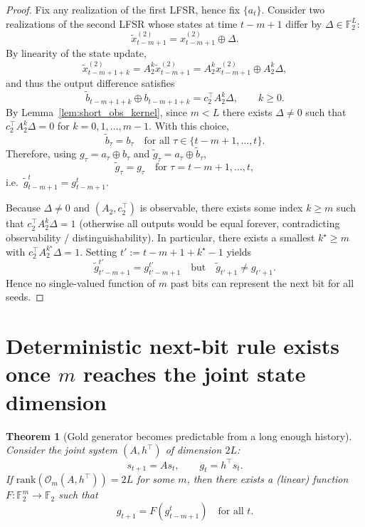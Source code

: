 \documentclass[12pt,a4paper]{report}
\newcommand{\F}{\mathbb{F}}
\newcommand{\rank}{\mathrm{rank}}
\theoremstyle{plain}
\newtheorem{thm}{Theorem}
\begin{document}
\begin{proof}
Fix any realization of the first LFSR, hence fix $\{a_t\}$.
Consider two realizations of the second LFSR whose states at time $t-m+1$ differ by
$\Delta\in \F_2^L$:
\begin{equation}
\tilde x^{(2)}_{t-m+1} = x^{(2)}_{t-m+1}\oplus \Delta.
\end{equation}
By linearity of the state update,
\[
\tilde x^{(2)}_{t-m+1+k} = A_2^k \tilde x^{(2)}_{t-m+1}
= A_2^k x^{(2)}_{t-m+1}\oplus A_2^k\Delta,
\]
and thus the output difference satisfies
\begin{equation}
\tilde b_{t-m+1+k}\oplus b_{t-m+1+k}
= c_2^\top A_2^k \Delta,\qquad k\ge 0. \label{eq:diff_outputs}
\end{equation}
By Lemma~\ref{lem:short_obs_kernel}, since $m<L$ there exists $\Delta\neq 0$ such that
$c_2^\top A_2^k\Delta=0$ for $k=0,1,\dots,m-1$. With this choice,
\[
\tilde b_{\tau} = b_{\tau}\quad \text{for all }\tau\in\{t-m+1,\dots,t\}.
\]
Therefore, using $g_\tau=a_\tau\oplus b_\tau$ and $\tilde g_\tau=a_\tau\oplus \tilde b_\tau$,
\[
\tilde g_\tau = g_\tau\quad\text{for }\tau=t-m+1,\dots,t,
\]
i.e.\ $\tilde g_{t-m+1}^t = g_{t-m+1}^t$.

Because $\Delta\neq 0$ and $(A_2,c_2^\top)$ is observable, there exists some index $k\ge m$
such that $c_2^\top A_2^k\Delta=1$ (otherwise all outputs would be equal forever, contradicting
observability / distinguishability). In particular, there exists a smallest $k^\star\ge m$
with $c_2^\top A_2^{k^\star}\Delta=1$. Setting $t':=t-m+1+k^\star-1$ yields
\[
\tilde g_{t'-m+1}^{t'} = g_{t'-m+1}^{t'}
\quad\text{but}\quad
\tilde g_{t'+1}\neq g_{t'+1}.
\]
Hence no single-valued function of $m$ past bits can represent the next bit for all seeds.
\end{proof}

\section{Deterministic next-bit rule exists once $m$ reaches the joint state dimension}

\begin{thm}[Gold generator becomes predictable from a long enough history]
\label{thm:gold_predictable_when_observable}
Consider the joint system $(A,h^\top)$ of dimension $2L$:
\[
s_{t+1}=As_t,\qquad g_t=h^\top s_t.
\]
If $\rank(\mathcal{O}_m(A,h^\top)) = 2L$ for some $m$, then there exists a (linear) function
$F:\F_2^m\to\F_2$ such that
\[
g_{t+1} = F(g_{t-m+1}^t)\quad\text{for all }t.
\]
\end{thm}
\end{document}
